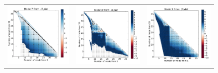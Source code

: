 \begin{figure}[H]
\begin{center}
\begin{tabular}{c c c}
				\includegraphics{image/image/P1-F331} & \includegraphics{image/image/P1-F332} & \includegraphics{image/image/P1-F333} \\

\end{tabular}
\end{center}
\end{figure}
